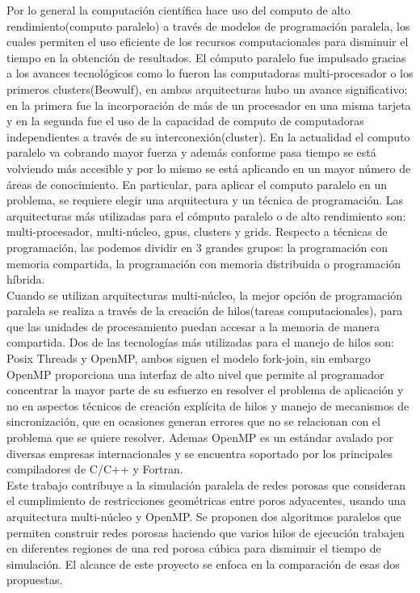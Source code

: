 Por lo general la computación científica hace uso  del computo de alto rendimiento(computo paralelo) a través de modelos de programación paralela, los cuales permiten  el uso eficiente de los recursos computacionales para disminuir el tiempo en la obtenci\'on de resultados.
El c\'omputo paralelo fue impulsado gracias a los avances tecnológicos como lo fueron las computadoras multi-procesador o los primeros clusters(Beowulf), en ambas arquitecturas hubo un avance significativo; en la primera fue la incorporación de más de un procesador en una misma tarjeta y en la segunda fue el uso de la capacidad de computo de computadoras independientes a través de su interconexión(cluster). En la actualidad el computo paralelo va cobrando mayor fuerza y adem\'as conforme pasa tiempo se est\'a volviendo más accesible y por lo mismo se est\'a aplicando en un mayor número de áreas de conocimiento. En particular, para aplicar el computo paralelo en un problema, se requiere elegir una arquitectura y un técnica de programación. Las arquitecturas más utilizadas para el cómputo paralelo o de alto rendimiento son: multi-procesador, multi-núcleo, gpus, clusters y grids. Respecto a técnicas de programación,  las podemos dividir en 3 grandes grupos: la programación con memoria compartida, la programación con memoria distribuida o programación híbrida.\\


Cuando se utilizan arquitecturas multi-núcleo, la mejor opci\'on de programación paralela se realiza a través de la creaci\'on de hilos(tareas computacionales), para que las unidades de procesamiento puedan accesar a la memoria de manera compartida. Dos de las tecnologías más utilizadas para el manejo de hilos son: Posix Threads\cite{ref13} y OpenMP\cite{ref6}, ambos siguen el modelo fork-join, sin embargo OpenMP proporciona una interfaz de alto nivel que permite al programador concentrar la mayor parte de su esfuerzo en resolver el problema de aplicaci\'on y no en aspectos técnicos de creaci\'on expl\'icita de hilos y manejo de mecanismos de sincronizaci\'on, que en ocasiones generan errores que no se relacionan con el problema que se quiere resolver. Ademas OpenMP es un estándar avalado por diversas empresas internacionales y se encuentra soportado por los principales compiladores de C/C++ y Fortran.\\ 

Este trabajo contribuye a la simulaci\'on paralela de redes porosas que consideran el cumplimiento de restricciones geom\'etricas entre poros adyacentes, usando una arquitectura multi-núcleo y OpenMP. Se proponen dos algoritmos paralelos que permiten construir redes porosas haciendo que varios hilos de ejecuci\'on trabajen en diferentes regiones de una red porosa c\'ubica para disminuir el tiempo de simulaci\'on. El alcance de este proyecto se enfoca en la comparaci\'on de esas dos propuestas. \\

